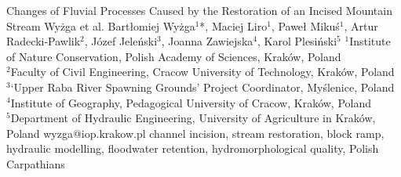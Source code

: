 \abstract
{Changes of Fluvial Processes Caused by the Restoration of
	an Incised Mountain Stream
} %
{Wyżga et al.} %
{Bartłomiej Wyżga$^1$*, Maciej Liro$^1$, Paweł Mikuś$^1$, Artur Radecki-Pawlik$^2$, Józef Jeleński$^3$, Joanna Zawiejska$^4$, Karol Plesiński$^5$} %
{\KLtag} %
{$^1$Institute of Nature Conservation, Polish Academy of Sciences, Kraków, Poland\\
$^2$Faculty of Civil Engineering, Cracow University of Technology, Kraków, Poland\\
$^3$‘Upper Raba River Spawning Grounds’ Project Coordinator, Myślenice, Poland\\
$^4$Institute of Geography, Pedagogical University of Cracow, Kraków, Poland\\
$^5$Department of Hydraulic Engineering, University of Agriculture in Kraków, Poland
} %
{wyzga@iop.krakow.pl}  %
{channel incision, stream restoration, block ramp, hydraulic modelling, floodwater retention, hydromorphological quality, Polish Carpathians}%
